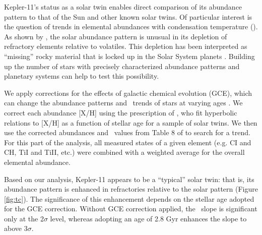 \documentclass[oneside]{emulateapj}
\begin{document}
Kepler-11's status as a solar twin enables direct comparison of its abundance pattern to that of the Sun and other known solar twins. Of particular interest is the question of trends in elemental abundances with condensation temperature (\tc). As shown by \citet{Melendez2009}, the solar abundance pattern is unusual in its depletion of refractory elements relative to volatiles. This depletion has been interpreted as ``missing'' rocky material that is locked up in the Solar System planets \citep{Chambers2010}. Building up the number of stars with precisely characterized abundance patterns and planetary systems can help to test this possibility.

We apply corrections for the effects of galactic chemical evolution (GCE), which can change the abundance patterns and \tc\ trends of stars at varying ages \citep{Nissen2015, Spina2016}. We correct each abundance [X/H] using the prescription of \citet{Spina2016b}, who fit hyperbolic relations to [X/H] as a function of stellar age for a sample of solar twins. We then use the corrected abundances and \tc\ values from Table 8 of \citet{Lodders2003} to search for a trend. For this part of the analysis, all measured states of a given element (e.g. CI and CH, TiI and TiII, etc.) were combined with a weighted average for the overall elemental abundance. %

Based on our analysis, Kepler-11 appears to be a ``typical'' solar twin: that is, its abundance pattern is enhanced in refractories relative to the solar pattern (Figure \ref{fig:tc}). The significance of this enhancement depends on the stellar age adopted for the GCE correction. Without GCE correction applied, the \tc\ slope is significant only at the 2$\sigma$ level, whereas adopting an age of 2.8 Gyr enhances the slope to above 3$\sigma$.

\end{document}
